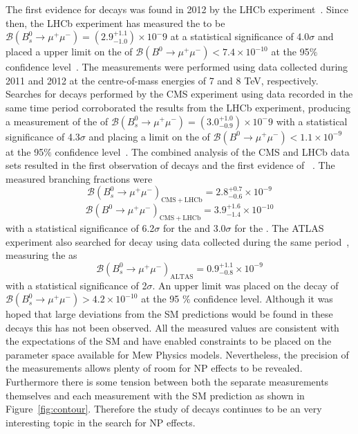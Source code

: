 The first evidence for \bsmumu decays was found in 2012 by the LHCb experiment~\cite{Aaij:2012nna}. Since then,
the LHCb experiment has measured the \bsmumu \BF to be $\mathcal{B}(B^{0}_{s} \to \mu^+ \mu^-) = (2.9^{+1.1}_{-1.0})\times 10^-9$ at a statistical significance of 4.0$\sigma$ and placed a upper limit on the \bdmumu \BF of $\mathcal{B}(B^{0} \to \mu^+ \mu^-) < 7.4 \times 10^{-10}$ at the 95$\%$ confidence level~\cite{Aaij:2013aka}. The measurements were performed using data collected during 2011 and 2012 at the centre-of-mass energies of 7 and 8 TeV, respectively. Searches for \bmumu decays performed by the CMS experiment using data recorded in the same time period corroborated the results from the LHCb experiment, producing a measurement of the \bsmumu \BF of $\mathcal{B}(B^{0}_{s} \to \mu^+ \mu^-) = (3.0^{+1.0}_{-0.9})\times 10^-9$ with a statistical significance of 4.3$\sigma$ and placing a limit on the \bdmumu \BF of $\mathcal{B}(B^{0} \to \mu^+ \mu^-) < 1.1 \times 10^{-9}$ at the 95$\%$ confidence level~\cite{Chatrchyan:2013bka}. 
The combined analysis of the CMS and LHCb data sets resulted in the first observation of \bsmumu decays and the first evidence of \bdmumu~\cite{CMS:2014xfa}. The measured branching fractions were 
\begin{equation}
\mathcal{B}(B^{0}_{s} \to \mu^+ \mu^-)_{\mathrm{CMS + LHCb}}  = 2.8^{+0.7}_{-0.6} \times 10^{-9}
\end{equation}
\begin{equation}
\mathcal{B}(B^{0} \to \mu^+ \mu^-)_{\mathrm{CMS + LHCb}}  = 3.9^{+1.6}_{-1.4} \times 10^{-10}
\end{equation}
with a statistical significance of 6.2$\sigma$ for the \bs and 3.0$\sigma$ for the \bd. The ATLAS experiment also searched for \bmumu decay using data collected during the same period~\cite{Aaboud:2016ire}, measuring the \bsmumu \BF as 
\begin{equation}
\mathcal{B}(B^{0}_{s} \to \mu^+ \mu^-)_{\mathrm{ALTAS}}  = 0.9^{+1.1}_{-0.8} \times 10^{-9}
\end{equation}
with a statistical significance of 2$\sigma$. An upper limit was placed on the \bdmumu decay of $\mathcal{B}(B^{0}_{s} \to \mu^+ \mu^-) >4.2 \times 10^{-10}$ at the 95 $\%$ confidence level.
Although it was hoped that large deviations from the SM predictions would be found in these decays this has not been observed. 
All the measured values are consistent with the expectations of the SM and have enabled constraints to be placed on the parameter space available for Mew Physics models. Nevertheless, the precision of the measurements allows plenty of room for NP effects to be revealed. Furthermore there is some tension between both the separate measurements themselves and each measurement with the SM prediction as shown in Figure~\ref{fig:contour}. Therefore the study of \bmumu decays continues to be an very interesting topic in the search for NP effects. 
 
